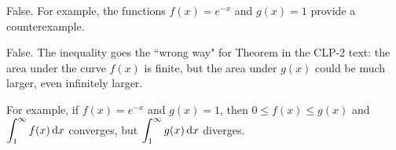\begin{answer}
False. For example, the functions $f(x)=e^{-x}$ and $g(x)=1$ provide a counterexample.


\end{answer}

\begin{solution}
False. The inequality goes the ``wrong way" for Theorem 
 in the CLP-2 text: the area under the curve $f(x)$ is finite, but the area under $g(x)$ could be much larger, even infinitely larger.

 For example, if $f(x)=e^{-x}$ and $g(x)=1$,
then $0 \leq f(x) \leq g(x)$ and $\displaystyle\int_{1}^{\infty} f(x) \,\mathrm{d}x$ converges, but
$\displaystyle\int_{1}^{\infty} g(x) \,\mathrm{d}x$ diverges.
\end{solution}

